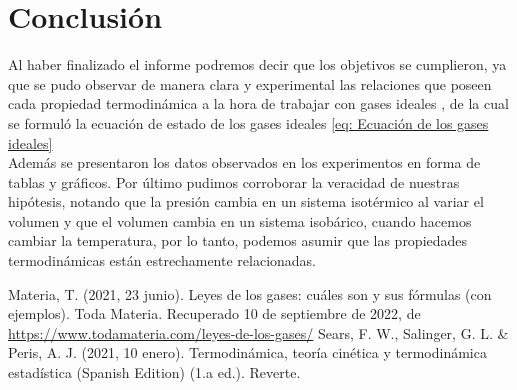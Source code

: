 \documentclass[a4paper, 12p]{article}
\begin{document}
\section[]{Conclusión}
Al haber finalizado el informe podremos decir que los objetivos se cumplieron, ya que se pudo observar de manera clara y experimental las relaciones que poseen cada propiedad termodinámica a la hora de trabajar con gases ideales ,
 de la cual se formuló la ecuación de estado de los gases ideales \eqref{eq: Ecuación de los gases ideales} \\
 Además se presentaron los datos observados en los experimentos en forma de tablas y gráficos. 
 Por último pudimos corroborar la veracidad de nuestras hipótesis, notando que la presión cambia en un sistema isotérmico al variar el volumen y que  el volumen cambia en un sistema isobárico, cuando hacemos cambiar la temperatura, por lo tanto, podemos asumir que las propiedades termodinámicas están estrechamente relacionadas.










\begin{thebibliography}{6}
       Materia, T. (2021, 23 junio). Leyes de los gases: cuáles son y sus fórmulas (con ejemplos). Toda Materia. Recuperado 10 de septiembre de 2022, 
      de \url{https://www.todamateria.com/leyes-de-los-gases/}
      Sears, F. W., Salinger, G. L. \& Peris, A. J. (2021, 10 enero). Termodinámica, teoría cinética y termodinámica estadística (Spanish Edition) (1.a ed.). Reverte.
\end{thebibliography}
\end{document}
